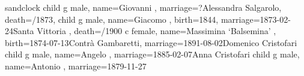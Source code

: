 \documentclass{article}
\begin{document}
\begin{midpage}
\begin{center}

\begin{genealogypicture}[
    processing=database,
    database format=full,
    node size=3.8cm,
    level size=2.8cm,
    level distance=6mm,
    list separators hang=3mm,
    name font=\bfseries,
    surn code={\textcolor{black!50!black}{#1}},
    place text={\newline}{},
    date format=d month yyyy,
    tcbset={male/.style={colframe=blue,colback=blue!5},
    female/.style={colframe=red,colback=red!5}},
    box={fit basedim=7pt,boxsep=2pt,segmentation style=solid,
        halign=left,before upper=\parskip1pt,
        \gtrDBsex,
    },
]
sandclock
{
    child{
        g{
            male,
            name={Giovanni },
            marriage={?}{Alessandra Salgarolo},
            death={/1873}{},
        }
        child{
            g{
                male,
                name={Giacomo },
                birth={1844}{},
                marriage={1873-02-24}{Santa Vittoria },
                death={/1900}
            }
            c{
                female,
                name={Massimina `Balsemina' },
                birth={1874-07-13}{Contrà Gambaretti},
                marriage={1891-08-02}{Domenico Cristofari}
            }
        }
        child{
            g{
                male,
                name={Angelo },
                marriage={1885-02-07}{Anna Cristofari}
            }
        }
        child{
            g{
                male,
                name={Antonio },
                marriage={1879-11-27}{}
            }
        }
    }
}
\end{genealogypicture}

\end{center}
\end{midpage}
\end{document}
